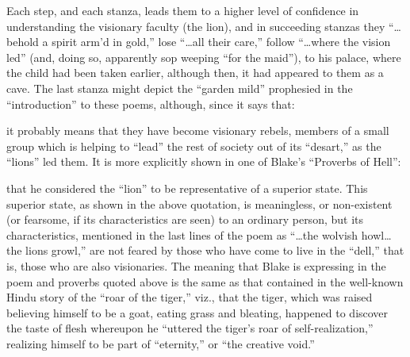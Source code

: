 
Each step, and each stanza, leads them to a higher level of confidence in understanding the visionary faculty (the lion), and in
succeeding stanzas they \enquote{\dots behold a spirit arm'd in gold,} lose \enquote{\dots all their care,} follow \enquote{\dots where the vision
led} (and, doing so, apparently sop weeping \enquote{for the maid}), to his palace, where the child had been taken earlier, although then,
it had appeared to them as a cave. The last stanza might depict the \enquote{garden mild} prophesied in the \enquote{introduction} to these poems, although,
since it says that:


\noindent it probably means that they have become visionary rebels, members of a small group which is helping to \enquote{lead} the rest
of society out of its \enquote{desart,} as the \enquote{lions} led them. It is more explicitly shown in one of Blake's \enquote{Proverbs of Hell}:


\noindent that he considered the \enquote{lion} to be representative of a superior state. This superior state, as shown in the above
quotation, is meaningless, or non-existent (or fearsome, if its characteristics are seen) to an ordinary person, but its characteristics,
mentioned in the last lines of the poem as \enquote{\dots the wolvish howl\dots the lions growl,} are not feared by those who have come to live in the
\enquote{dell,} that is, those who are also visionaries. The meaning that Blake is expressing in the poem and proverbs quoted above is the same
as that contained in the well-known Hindu story of the \enquote{roar of the tiger,} viz., that the tiger, which was raised believing himself to be a goat,
eating grass and bleating, happened to discover the taste of flesh whereupon he \enquote{uttered the tiger's roar of self-realization,}
realizing himself to be part of \enquote{eternity,} or \enquote{the creative void.}

\label{self:02}

